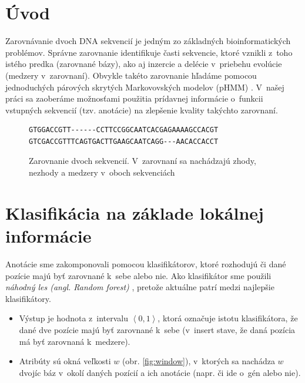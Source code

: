 \documentclass[myposter,portrait]{sciposter}
\def\mysection#1{
{\color{SectionCol}\section*{\sc\bfseries #1}}}
\begin{document}
\begin{multicols*}{3}

\mysection{Úvod}

Zarovnávanie dvoch DNA sekvencií je jedným zo základných
bioinformatických problémov. Správne zarovnanie identifikuje časti
sekvencie, ktoré vznikli z~toho istého predka (zarovnané bázy), ako aj
inzercie a delécie v~priebehu evolúcie (medzery v~zarovnaní). Obvykle
takéto zarovnanie hľadáme pomocou jednoduchých párových skrytých
Markovovských modelov (pHMM) \cite{durbin}. V~našej práci \cite{hozzaThesis} sa zaoberáme
možnosťami použitia prídavnej informácie o~funkcii vstupných sekvencií
(tzv. anotácie) na zlepšenie kvality takýchto zarovnaní.


\begin{figure}[hbtp]
    \centering
    \begin{BVerbatim}
GTGGACCGTT------CCTTCCGGCAATCACGAGAAAAGCCACGT
GTCGACCGTTTCAGTGACTTGAAGCAATCAGG---AACACCACCT
    \end{BVerbatim}
    \caption{Zarovnanie dvoch sekvencií. V~zarovnaní sa nachádzajú zhody, nezhody a medzery v~oboch sekvenciách}
    \label{fig:alignment_example}
\end{figure}

\mysection{Klasifikácia na základe lokálnej informácie}

Anotácie sme zakomponovali pomocou klasifikátorov, ktoré rozhodujú či dané pozície majú byť zarovnané k~sebe alebo nie. Ako klasifikátor sme použili \emph{náhodný les (angl. Random forest)} \cite{randomForestPaper}, pretože aktuálne patrí medzi najlepšie klasifikátory.

\begin{itemize}
    \item Výstup je hodnota z~intervalu $\left<0,1\right>$, ktorá označuje istotu klasifikátora, že dané dve pozície majú byť zarovnané k~sebe (v~insert stave, že daná pozícia má byť zarovnaná k~medzere).
    \item Atribúty sú okná veľkosti $w$ (obr. \ref{fig:window}), v~ktorých sa nachádza $w$ dvojíc báz v~okolí daných pozícií a ich anotácie (napr. či ide o~gén alebo nie).
\end{itemize}


\end{multicols*}
\end{document}

